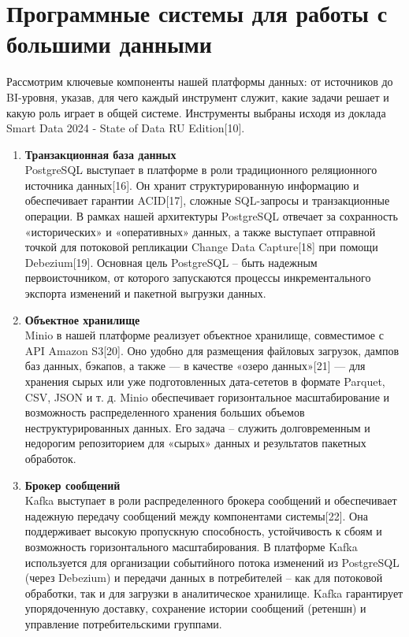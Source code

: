 \section{Программные системы для работы с большими данными} \label{ch2:system_description}
Рассмотрим ключевые компоненты нашей платформы данных: от источников до BI-уровня, указав, для чего каждый инструмент служит, какие задачи решает и какую роль играет в общей системе. Инструменты выбраны исходя из доклада Smart Data 2024 - State of Data RU Edition[10].
\begin{enumerate}[1.]
	\item \textbf{Транзакционная база данных}\\
	      PostgreSQL выступает в платформе в роли традиционного реляционного источника данных[16]. Он хранит структурированную информацию и обеспечивает гарантии ACID[17], сложные SQL-запросы и транзакционные операции. В рамках нашей архитектуры PostgreSQL отвечает за сохранность «исторических» и «оперативных» данных, а также выступает отправной точкой для потоковой репликации Change Data Capture[18] при помощи Debezium[19]. Основная цель PostgreSQL – быть надежным первоисточником, от которого запускаются процессы инкрементального экспорта изменений и пакетной выгрузки данных.
	\item \textbf{Объектное хранилище}\\
	      Minio в нашей платформе реализует объектное хранилище, совместимое с API Amazon S3[20]. Оно удобно для размещения файловых загрузок, дампов баз данных, бэкапов, а также — в качестве «озеро данных»[21] — для хранения сырых или уже подготовленных дата-сететов в формате Parquet, CSV, JSON и т. д. Minio обеспечивает горизонтальное масштабирование и возможность распределенного хранения больших объемов неструктурированных данных. Его задача – служить долговременным и недорогим репозиторием для «сырых» данных и результатов пакетных обработок.
	\item \textbf{Брокер сообщений}\\
	      Kafka выступает в роли распределенного брокера сообщений и обеспечивает надежную передачу сообщений между компонентами системы[22]. Она поддерживает высокую пропускную способность, устойчивость к сбоям и возможность горизонтального масштабирования. В платформе Kafka используется для организации событийного потока изменений из PostgreSQL (через Debezium) и передачи данных в потребителей – как для потоковой обработки, так и для загрузки в аналитическое хранилище. Kafka гарантирует упорядоченную доставку, сохранение истории сообщений (ретеншн) и управление потребительскими группами.

\end{enumerate}
